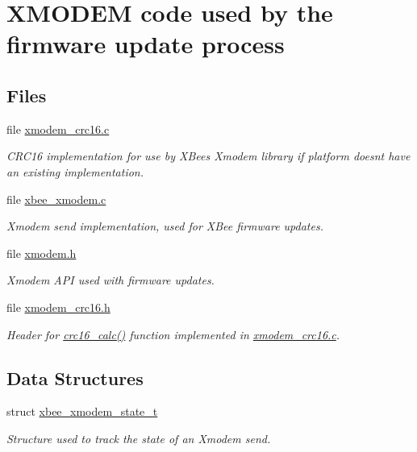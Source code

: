 \hypertarget{group__util__xmodem}{}\section{X\+M\+O\+D\+EM code used by the firmware update process}
\label{group__util__xmodem}
\subsection*{Files}
\begin{DoxyCompactItemize}
\item 
file \hyperlink{xmodem__crc16_8c}{xmodem\+\_\+crc16.\+c}
\begin{DoxyCompactList}\small\item\em C\+R\+C16 implementation for use by X\+Bee\textquotesingle{}s Xmodem library if platform doesn\textquotesingle{}t have an existing implementation. \end{DoxyCompactList}\item 
file \hyperlink{xbee__xmodem_8c}{xbee\+\_\+xmodem.\+c}
\begin{DoxyCompactList}\small\item\em Xmodem send implementation, used for X\+Bee firmware updates. \end{DoxyCompactList}\item 
file \hyperlink{xmodem_8h}{xmodem.\+h}
\begin{DoxyCompactList}\small\item\em Xmodem A\+PI used with firmware updates. \end{DoxyCompactList}\item 
file \hyperlink{xmodem__crc16_8h}{xmodem\+\_\+crc16.\+h}
\begin{DoxyCompactList}\small\item\em Header for \hyperlink{group__util__xmodem_ga48b65051c5461be6d016802e2eb8a138}{crc16\+\_\+calc()} function implemented in \hyperlink{xmodem__crc16_8c}{xmodem\+\_\+crc16.\+c}. \end{DoxyCompactList}\end{DoxyCompactItemize}
\subsection*{Data Structures}
\begin{DoxyCompactItemize}
\item 
struct \hyperlink{structxbee__xmodem__state__t}{xbee\+\_\+xmodem\+\_\+state\+\_\+t}
\begin{DoxyCompactList}\small\item\em Structure used to track the state of an Xmodem send. \end{DoxyCompactList}\end{DoxyCompactItemize}
